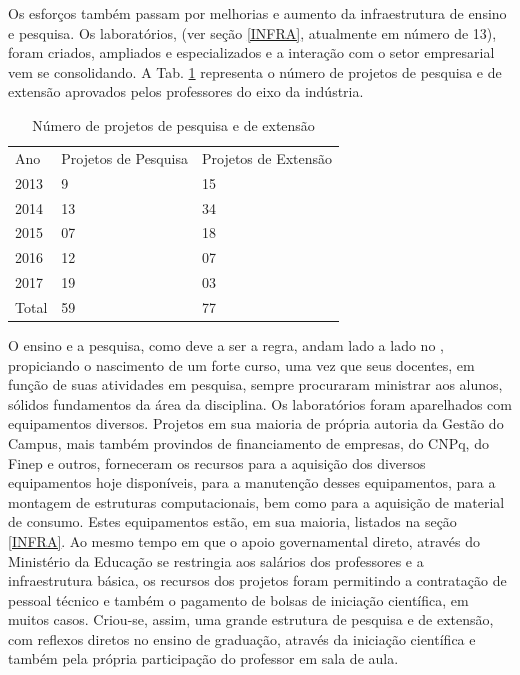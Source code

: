 Os esforços também passam por melhorias e aumento da infraestrutura de ensino e pesquisa. Os laboratórios, (ver seção \ref{INFRA}, atualmente em número de 13), foram criados, ampliados e especializados e a interação com o setor empresarial vem se consolidando. A Tab. \ref{tab11} representa o número de projetos de pesquisa e de extensão aprovados pelos professores do eixo da indústria. 

\begin{longtable}{|p{1.5cm}|p{4.5cm}|p{4.5cm}|}
	\caption{Número de projetos de pesquisa e de extensão}    \label{tab11} 
	\vspace{-0.25cm}
	\\ \hline 
	\cellcolor{\cinza} Ano & \cellcolor{\cinza}Projetos de Pesquisa & \cellcolor{\cinza}Projetos de Extensão  \\ 
	\hline
	2013 &  9  &  15 \\ \hline
	2014 &  13  &  34 \\ \hline
	2015 &  07  &  18 \\ \hline
	2016 &  12  &  07 \\ \hline
	2017 &  19  &  03 \\ \hline
	Total &  59  & 77 \\ \hline
\end{longtable}

O ensino e a pesquisa, como deve a ser a regra, andam lado a lado no \NOMECURSO, propiciando o nascimento de um forte curso, uma vez que seus docentes, em função de suas atividades em pesquisa, sempre procuraram ministrar aos alunos, sólidos fundamentos da área da disciplina. Os laboratórios foram aparelhados com equipamentos diversos. Projetos em sua maioria de própria autoria da Gestão do Campus, mais também provindos de financiamento de empresas, do CNPq, do Finep e outros, forneceram os recursos para a aquisição dos diversos equipamentos hoje disponíveis, para a manutenção desses equipamentos, para a montagem de estruturas computacionais, bem como para a aquisição de material de consumo. Estes equipamentos estão, em sua maioria, listados na seção \ref{INFRA}. Ao mesmo tempo em que o apoio governamental direto, através do Ministério da Educação se restringia aos salários dos professores e a infraestrutura básica, os recursos dos projetos foram permitindo a contratação de pessoal técnico e também o pagamento de bolsas de iniciação científica, em muitos casos. Criou-se, assim, uma grande estrutura de pesquisa e de extensão, com reflexos diretos no ensino de graduação, através da iniciação científica e também pela própria participação do professor em sala de aula. 

